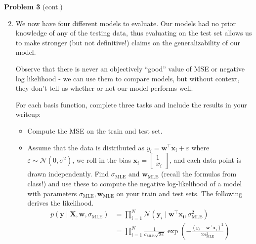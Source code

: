 \documentclass[submit]{harvardml}
\begin{document}
\newpage
\begin{framed}
\noindent\textbf{Problem 3} (cont.)\\
\begin{enumerate}
\setcounter{enumi}{1}
\item 

We now have four different models to evaluate. Our models had no
prior knowledge of any of the testing data, thus evaluating on
the test set allows us to make stronger (but not definitive!) 
claims on the generalizability of our model.

Observe that there is never an objectively ``good'' value of MSE or negative log likelihood - we can use them to compare models, but without context, they don't tell us whether or not our model performs well.

For each basis function, complete three tasks and include the
results in your writeup: 
\begin{itemize}
\item Compute the MSE on the train and test set. 

\item Assume that the data is distributed as 
$y_i = \mathbf{w}^\top \mathbf{x}_i + \varepsilon$ where 
$\varepsilon \sim \mathcal{N}(0, \sigma^2)$, we roll in the bias 
$\mathbf{x}_i = \begin{bmatrix} 1 \\ x_i \end{bmatrix}$, and each data point
is drawn independently. Find $\sigma_{\text{MLE}}$ and $\mathbf{w}_{\text{MLE}}$ (recall the formulas from class!) and use these to 
compute the negative log-likelihood of a model with parameters $\sigma_{\text{MLE}}, \mathbf{w}_{\text{MLE}}$ on your train and test sets. 
The following derives the likelihood.
\begin{align*} p(\mathbf{y}\mid \mathbf{X},\mathbf{w},\sigma_{\text{MLE}}) 
&= \prod_{i=1}^N \mathcal{N}(\mathbf{y}_i \mid \mathbf{w}^\top\mathbf{x_i}, \sigma_{\text{MLE}}^2) \\
&= \prod_{i=1}^N \frac{1}{\sigma_{\text{MLE}}\sqrt{2\pi}}\exp\left(-\frac{(y_i - \mathbf{w}^\top \mathbf{x}_i)^2}{2\sigma_{\text{MLE}}^2}\right)
\end{align*}


\end{itemize}
\end{enumerate}
\end{framed}
\end{document}
